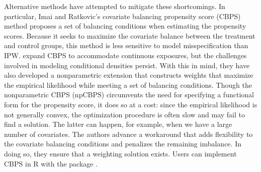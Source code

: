 Alternative methods have attempted to mitigate these shortcomings. In
particular, Imai and Ratkovic's
\citetext{\citeyear{imaiCovariateBalancingPropensity2014}; \citeyear{imaiRobustEstimationInverse2015}}
covariate balancing propensity score (CBPS) method proposes a set of
balancing conditions when estimating the propensity scores. Because it
seeks to maximize the covariate balance between the treatment and
control groups, this method is less sensitive to model misspecification
than IPW. \citet{fongCovariateBalancingPropensity2018} expand CBPS to
accommodate continuous exposures, but the challenges involved in
modeling conditional densities persist. With this in mind, they have
also developed a nonparametric extension that constructs weights that
maximize the empirical likelihood while meeting a set of balancing
conditions. Though the nonparametric CBPS (npCBPS) circumvents the need
for specifying a functional form for the propensity score, it does so at
a cost: since the empirical likelihood is not generally convex, the
optimization procedure is often slow and may fail to find a solution.
The latter can happen, for example, when we have a large number of
covariates. The authors advance a workaround that adds flexibility to
the covariate balancing conditions and penalizes the remaining
imbalance. In doing so, they ensure that a weighting solution exists.
Users can implement CBPS in R with the  package
\citep{R-CBPS}.

